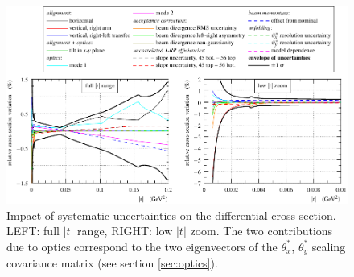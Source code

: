 \begin{figure}
\begin{center}
\includegraphics{fig/systematic_uncertainties.pdf}
\caption{%
Impact of systematic uncertainties on the differential cross-section. 
LEFT: full $|t|$ range, RIGHT: low $|t|$ zoom.
The two contributions due to optics correspond to the two eigenvectors of the $\theta_x^*$, $\theta_y^*$ scaling covariance matrix (see section \ref{sec:optics}).
}
\label{fig:syst unc}
\end{center}
\end{figure}
